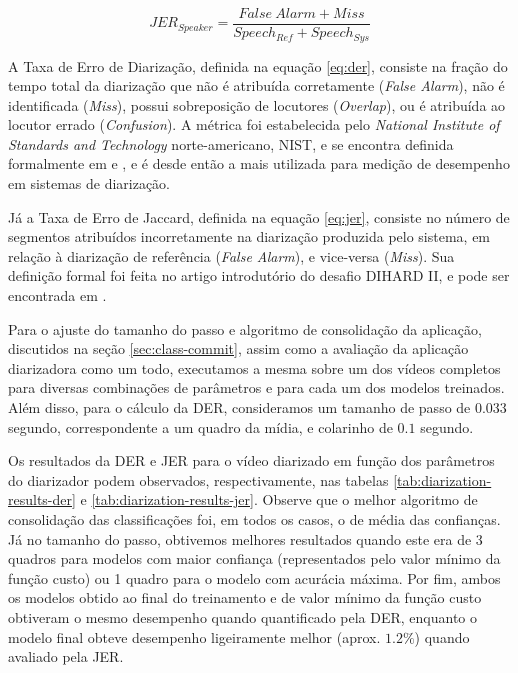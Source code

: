 \begin{equation}\label{eq:jer}
    JER_{Speaker} = \frac{False\ Alarm + Miss}{Speech_{Ref} + Speech_{Sys}}
\end{equation}

A Taxa de Erro de Diarização, definida na equação \ref{eq:der}, consiste na fração do tempo total da diarização que não é atribuída corretamente (\textit{False Alarm}), não é identificada (\textit{Miss}), possui sobreposição de locutores (\textit{Overlap}), ou é atribuída ao locutor errado (\textit{Confusion}).
A métrica foi estabelecida pelo \textit{National Institute of Standards and Technology} norte-americano, NIST, e se encontra definida formalmente em \cite{nist2009RT09Rich2009} e \cite{fiscusRichTranscription20062006}, e é desde então a mais utilizada para medição de desempenho em sistemas de diarização.

Já a Taxa de Erro de Jaccard, definida na equação \ref{eq:jer}, consiste no número de segmentos atribuídos incorretamente na diarização produzida pelo sistema, em relação à diarização de referência (\textit{False Alarm}), e vice-versa (\textit{Miss}).
Sua definição formal foi feita no artigo introdutório do desafio DIHARD II, e pode ser encontrada em  \cite{ryantSecondDIHARDDiarization2019}.

Para o ajuste do tamanho do passo e algoritmo de consolidação da aplicação, discutidos na seção \ref{sec:class-commit}, assim como a avaliação da aplicação diarizadora como um todo, executamos a mesma sobre um dos vídeos completos para diversas combinações de parâmetros e para cada um dos modelos treinados. 
Além disso, para o cálculo da DER, consideramos um tamanho de passo de $0.033$ segundo, correspondente a um quadro da mídia, e colarinho de $0.1$ segundo.

Os resultados da DER e JER para o vídeo diarizado em função dos parâmetros do diarizador podem observados, respectivamente, nas tabelas \ref{tab:diarization-results-der} e \ref{tab:diarization-results-jer}.
Observe que o melhor algoritmo de consolidação das classificações foi, em todos os casos, o de média das confianças.
Já no tamanho do passo, obtivemos melhores resultados quando este era de 3 quadros para modelos com maior confiança (representados pelo valor mínimo da função custo) ou 1 quadro para o modelo com acurácia máxima.
Por fim, ambos os modelos obtido ao final do treinamento e de valor mínimo da função custo obtiveram o mesmo desempenho quando quantificado pela DER, enquanto o modelo final obteve desempenho ligeiramente melhor (aprox. $1.2\%$) quando avaliado pela JER.

